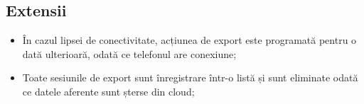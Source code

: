 \subsection{Extensii}\label{extensii-2}

\begin{itemize}
\item
  În cazul lipsei de conectivitate, acțiunea de export este programată pentru o dată ulterioară, odată ce telefonul are conexiune;
\item
  Toate sesiunile de export sunt înregistrare într-o listă și sunt eliminate odată ce datele aferente sunt șterse din cloud;
\end{itemize}
